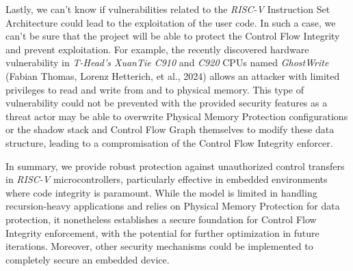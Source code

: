 Lastly, we can't know if vulnerabilities related to the \textit{RISC-V} Instruction
Set Architecture could lead to the exploitation of the user code. In such a case,
we can't be sure that the project will be able to protect the Control Flow Integrity
and prevent exploitation. For example, the recently discovered hardware vulnerability
in \textit{T-Head's XuanTie C910} and \textit{C920} CPUs named \textit{GhostWrite}\cite{riscvuzz}
(Fabian Thomas, Lorenz Hetterich, et al., 2024) allows an attacker with limited privileges
to read and write from and to physical memory. This type of vulnerability could
not be prevented with the provided security features as a threat actor may be
able to overwrite Physical Memory Protection configurations or the shadow stack
and Control Flow Graph themselves to modify these data structure, leading to a compromisation
of the Control Flow Integrity enforcer.

In summary, we provide robust protection against unauthorized control transfers
in \textit{RISC-V} microcontrollers, particularly effective in embedded
environments where code integrity is paramount. While the model is limited in handling
recursion-heavy applications and relies on Physical Memory Protection for data protection,
it nonetheless establishes a secure foundation for Control Flow Integrity
enforcement, with the potential for further optimization in future iterations.
Moreover, other security mechanisms could be implemented to completely secure an
embedded device.
